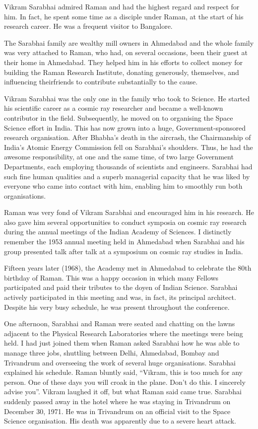 \noindent
Vikram Sarabhai admired Raman and had the highest regard and respect for him. In fact, he spent some time as a disciple under Raman, at the start of his research career. He was a frequent visitor to Bangalore.

The Sarabhai family are wealthy mill owners in Ahmedabad and the whole family was very attached to Raman, who had, on \hbox{several} occasions, been their guest at their home in Ahmedabad. They helped him in his efforts to collect money for building the Raman Research Institute, donating generously, themselves, and influencing their\break friends to contribute substantially to the cause.

Vikram Sarabhai was the only one in the family who took to Science. He started his scientific career as a cosmic ray researcher and became a well-known contributor in the field. Subsequently, he moved on to organising the Space Science effort in India. This has now grown into a huge, Government-sponsored research organisation. After Bhabha's death in the aircrash, the Chairmanship of India's Atomic Energy Commission fell on Sarabhai's shoulders. Thus, he had the awesome responsibility, at one and the same time, of two large Government Departments, each employing thousands of scientists and engineers. Sarabhai had such fine human qualities and a superb managerial capacity that he was liked by everyone who came into contact with him, enabling him to smoothly run both organisations.

Raman was very fond of Vikram Sarabhai and encouraged him in his research. He also gave him several opportunities to conduct symposia on cosmic ray research during the annual meetings of the Indian Academy of Sciences. I distinctly remember the 1953 annual meeting held in Ahmedabad when Sarabhai and his group presented talk after talk at a symposium on cosmic ray studies in India.

Fifteen years later (1968), the Academy met in Ahmedabad to celebrate the 80th birthday of Raman. This was a happy occasion in which many Fellows participated and paid their tributes to the doyen of Indian Science. Sarabhai actively participated in this meeting and was, in fact, its principal architect. Despite his very busy schedule, he was present throughout the conference.

One afternoon, Sarabhai and Raman were seated and chatting on the lawns adjacent to the Physical Research Laboratories where the meetings were being held. I had just joined them when Raman asked Sarabhai how he was able to manage three jobs, shuttling between Delhi, Ahmedabad, Bombay and Trivandrum and overseeing the work of several huge organisations. Sarabhai explained his schedule. Raman bluntly said, ``Vikram, this is too much for any person. One of these days you will croak in the plane. Don't do this. I sincerely advise you''. Vikram laughed it off, but what Raman said came true. Sarabhai suddenly passed away in the hotel where he was staying in Trivandrum on December 30, 1971. He was in Trivandrum on an official visit to the Space Science organisation. His death was apparently due to a severe heart attack.

